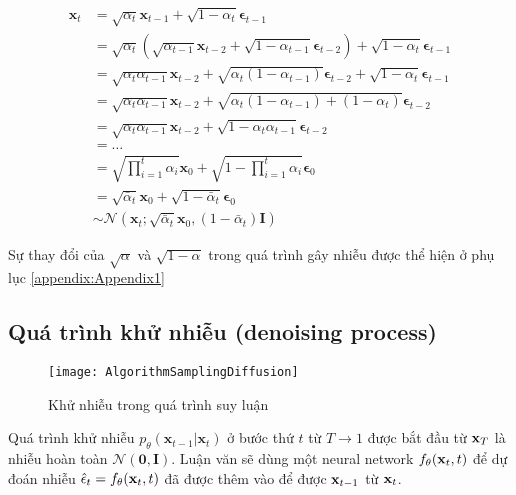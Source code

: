 \begin{equation}
\begin{aligned}
	\boldsymbol{x}_t &= \sqrt{\alpha_t}\boldsymbol{x}_{t-1} + \sqrt{1 - \alpha_t}\boldsymbol{\epsilon}_{t-1} \\
	&= \sqrt{\alpha_t}\left(\sqrt{\alpha_{t-1}}\boldsymbol{x}_{t-2} + \sqrt{1 - \alpha_{t-1}}\boldsymbol{\epsilon}_{t-2}\right) + \sqrt{1 - \alpha_t}\boldsymbol{\epsilon}_{t-1} \\
	&= \sqrt{\alpha_t\alpha_{t-1}}\boldsymbol{x}_{t-2} + \sqrt{\alpha_t(1 - \alpha_{t-1})}\boldsymbol{\epsilon}_{t-2} + \sqrt{1 - \alpha_t}\boldsymbol{\epsilon}_{t-1} \\
	&= \sqrt{\alpha_t\alpha_{t-1}}\boldsymbol{x}_{t-2} + \sqrt{\alpha_t(1 - \alpha_{t-1}) + (1 - \alpha_t)}\boldsymbol{\epsilon}_{t-2} \\
	&= \sqrt{\alpha_t\alpha_{t-1}}\boldsymbol{x}_{t-2} + \sqrt{1 - \alpha_t\alpha_{t-1}}\boldsymbol{\epsilon}_{t-2} \\
	&= \ldots \\
	&= \sqrt{\prod_{i=1}^t \alpha_i} \boldsymbol{x}_0 + \sqrt{1 - \prod_{i=1}^t \alpha_i} \boldsymbol{\epsilon}_0 \\
	&= \sqrt{\bar{\alpha}_t} \boldsymbol{x}_0 + \sqrt{1 - \bar{\alpha}_t} \boldsymbol{\epsilon}_0 \\
	&\sim \mathcal{N}\left(\boldsymbol{x}_t; \sqrt{\bar{\alpha}_t} \boldsymbol{x}_0, \left(1 - \bar{\alpha}_t\right) \textbf{I}\right)
\end{aligned}
\label{eq:tracexzero}
\end{equation}

Sự thay đổi của $\sqrt{\alpha}$ và  $\sqrt{1- \alpha}$ trong quá trình gây nhiễu được thể hiện ở phụ lục \autoref{appendix:Appendix1}

\subsection{Quá trình khử nhiễu (denoising process)}
\label{subsection:denoising_process}

\begin{figure}[H]
	\centering
	\texttt{[image: AlgorithmSamplingDiffusion]}
	\caption{Khử nhiễu trong quá trình suy luận}
	\label{fig:AlgorithmSamplingDiffusion}
	\vspace{-5pt}
\end{figure}

Quá trình khử nhiễu $p_\theta(\mathbf{x}_{t-1} \vert \mathbf{x}_t)$  ở bước thứ $t$ từ $T \to 1$ được bắt đầu từ $\mathbf{x}_T$ là nhiễu hoàn toàn $\mathcal{N} (\mathbf{0}, \mathbf{I})$. Luận văn sẽ dùng một neural network $f_{\theta} (\mathbf{x}_t, t)$ để dự đoán nhiễu $\hat{\epsilon}_t = f_{\theta}(\mathbf{x}_t, t)$ đã được thêm vào để được $\mathbf{x}_{t-1}$ từ $\mathbf{x}_t$.

